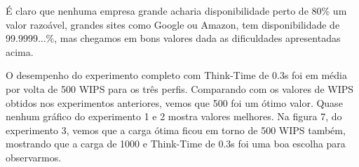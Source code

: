 \documentclass[11pt,twoside]{article}
\begin{document}
É claro que nenhuma empresa grande acharia disponibilidade perto de 80\% um valor razoável, grandes sites como Google ou Amazon, tem disponibilidade de 99.9999...\%, mas chegamos em bons valores dada as dificuldades apresentadas acima.

O desempenho do experimento completo com Think-Time de 0.3s foi em média por volta de 500 WIPS para os três perfis. Comparando com os valores de WIPS obtidos nos experimentos anteriores, vemos que 500 foi um ótimo valor. Quase nenhum gráfico do experimento 1 e 2 mostra valores melhores. Na figura 7, do experimento 3, vemos que a carga ótima ficou em torno de 500 WIPS também, mostrando que a carga de 1000 e Think-Time de 0.3s foi uma boa escolha para observarmos.

{}

\end{document}
